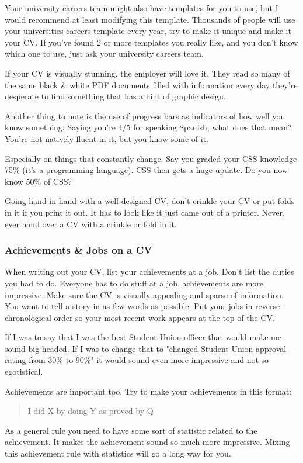 \documentclass{article}
\begin{document}
Your university careers team might also have templates for you to use,
but I would recommend at least modifying this template. Thousands of
people will use your universities careers template every year, try to
make it unique and make it your CV. If you've found 2 or more templates
you really like, and you don't know which one to use, just ask your
university careers team.

If your CV is visually stunning, the employer will love it. They read so
many of the same black \& white PDF documents filled with information
every day they're desperate to find something that has a hint of graphic
design.

Another thing to note is the use of progress bars as indicators of how
well you know something. Saying you're 4/5 for speaking Spanish, what
does that mean? You're not natively fluent in it, but you know some of
it.

Especially on things that constantly change. Say you graded your CSS
knowledge 75\% (it's a programming language). CSS then gets a huge
update. Do you now know 50\% of CSS?

Going hand in hand with a well-designed CV, don't crinkle your CV or put
folds in it if you print it out. It has to look like it just came out of
a printer. Never, ever hand over a CV with a crinkle or fold in it.
\subsubsection{Achievements \& Jobs on a CV}
When writing out your CV, list your achievements at a job. Don't list
the duties you had to do. Everyone has to do stuff at a job,
achievements are more impressive. Make sure the CV is visually appealing
and sparse of information. You want to tell a story in as few words as
possible. Put your jobs in reverse-chronological order so your most
recent work appears at the top of the CV.

If I was to say that I was the best Student Union officer that would
make me sound big headed. If I was to change that to "changed Student
Union approval rating from 30\% to 90\%" it would sound even more
impressive and not so egotistical.

Achievements are important too. Try to make your achievements in this
format:
\begin{quote}
    I did X by doing Y as proved by Q
\end{quote}

As a general rule you need to have some sort of statistic related to the
achievement. It makes the achievement sound so much more impressive.
Mixing this achievement rule with statistics will go a long way for you.
\end{document}

